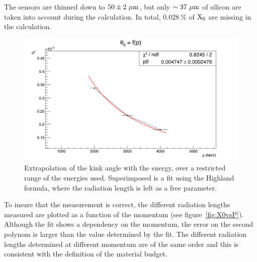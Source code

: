    The sensors are thinned down to $50 \pm 2~\rm{\mu m}$, but only $\sim 37~\rm{\mu m}$ of silicon are taken into account during the calculation.
   In total, $0.028~\%$ of $\rm{X_{0}}$ are missing in the calculation.
   
   \begin{figure}[!h]
     \centering
     \includegraphics[width = \textwidth]{Pictures/X0/theta0VsP_2-4GeV.png}
     \caption{Extrapolation of the kink angle with the energy, over a restricted range of the energies used.
     Superimposed is a fit using the Highland formula, where the radiation length is left as a free parameter.}
     \label{fig:theta0vsP_2-4}
   \end{figure}

   To insure that the measurement is correct, the different radiation lengths measured are plotted as a function of the momentum (see figure~\ref{fig:X0vsP}).
   Although the fit shows a dependency on the momentum, the error on the second polynom is larger than the value determined by the fit.
   The different radiation lengths determined at different momentum are of the same order and this is consistent with the definition of the material budget.



